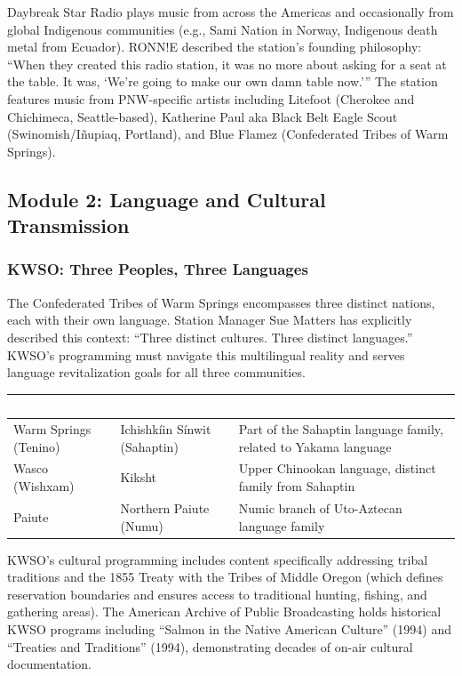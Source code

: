 \documentclass[11pt,letterpaper]{article}
\newcommand{\tableheader}[1]{\textbf{\sffamily\textcolor{white}{#1}}}
\begin{document}
Daybreak Star Radio plays music from across the Americas and occasionally from global Indigenous communities (e.g., Sami Nation in Norway, Indigenous death metal from Ecuador). RONN!E described the station's founding philosophy: ``When they created this radio station, it was no more about asking for a seat at the table. It was, `We're going to make our own damn table now.''' The station features music from PNW-specific artists including Litefoot (Cherokee and Chichimeca, Seattle-based), Katherine Paul aka Black Belt Eagle Scout (Swinomish/I\~nupiaq, Portland), and Blue Flamez (Confederated Tribes of Warm Springs).

\subsection{Module 2: Language and Cultural Transmission}

\subsubsection{KWSO: Three Peoples, Three Languages}

The Confederated Tribes of Warm Springs encompasses three distinct nations, each with their own language. Station Manager Sue Matters has explicitly described this context: ``Three distinct cultures. Three distinct languages.'' KWSO's programming must navigate this multilingual reality and serves language revitalization goals for all three communities.

\begin{center}
\begin{tabularx}{\textwidth}{L{3.5cm}L{4cm}X}
\toprule
{}
\tableheader{Nation} & \tableheader{Language} & \tableheader{Context} \\
\midrule
Warm Springs (Tenino) & Ichishkíin Sínwit (Sahaptin) & Part of the Sahaptin language family, related to Yakama language \\
Wasco (Wishxam) & Kiksht & Upper Chinookan language, distinct family from Sahaptin \\
Paiute & Northern Paiute (Numu) & Numic branch of Uto-Aztecan language family \\
\bottomrule
\end{tabularx}
\end{center}

KWSO's cultural programming includes content specifically addressing tribal traditions and the 1855 Treaty with the Tribes of Middle Oregon (which defines reservation boundaries and ensures access to traditional hunting, fishing, and gathering areas). The American Archive of Public Broadcasting holds historical KWSO programs including ``Salmon in the Native American Culture'' (1994) and ``Treaties and Traditions'' (1994), demonstrating decades of on-air cultural documentation.
\end{document}
